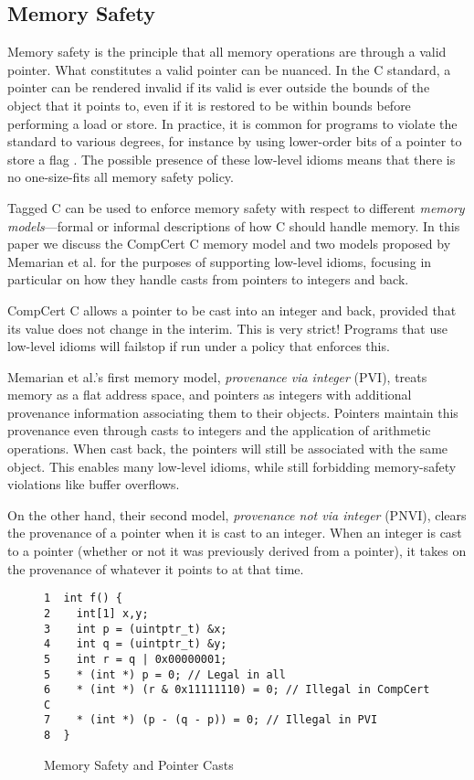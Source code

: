 \documentclass{llncs}
\begin{document}
\subsection{Memory Safety}

Memory safety is the principle that all memory operations are through a valid pointer. What constitutes
a valid pointer can be nuanced. In the C standard, a pointer can be rendered invalid if its valid
is ever outside the bounds of the object that it points to, even if it is restored to be within
bounds before performing a load or store. In practice, it is common for programs to violate the
standard to various degrees, for instance by using lower-order bits of a pointer to store a flag
\cite{Memarian16:DeFacto}. The possible presence of these low-level idioms means that there is
no one-size-fits all memory safety policy.

Tagged C can be used to enforce memory safety with respect to different {\em memory models}---formal
or informal descriptions of how C should handle memory. In this paper we discuss the CompCert C
memory model and two models proposed by Memarian et al. \cite{Memarian19:ExploringCSemantics}
for the purposes of supporting low-level idioms, focusing in particular on how they handle
casts from pointers to integers and back.

CompCert C allows a pointer to be cast into an integer and back, provided that its value
does not change in the interim. This is very strict! Programs that use low-level idioms
will failstop if run under a policy that enforces this.

Memarian et al.'s first memory model, {\em provenance via integer} (PVI), treats memory
as a flat address space, and pointers as integers with additional provenance information
associating them to their objects. Pointers maintain this provenance even through casts to
integers and the application of arithmetic operations. When cast back, the pointers will still
be associated with the same object. This enables many low-level idioms, while still forbidding
memory-safety violations like buffer overflows.

On the other hand, their second model, {\em provenance not via integer} (PNVI), clears the
provenance of a pointer when it is cast to an integer. When an integer is cast to a pointer
(whether or not it was previously derived from a pointer), it takes on the provenance of whatever
it points to at that time.

\begin{figure}
\begin{verbatim}
1  int f() {
2    int[1] x,y;
3    int p = (uintptr_t) &x;
4    int q = (uintptr_t) &y;
5    int r = q | 0x00000001;
5    * (int *) p = 0; // Legal in all
6    * (int *) (r & 0x11111110) = 0; // Illegal in CompCert C
7    * (int *) (p - (q - p)) = 0; // Illegal in PVI
8  }
\end{verbatim}
\caption{Memory Safety and Pointer Casts}
\label{fig:memsafe}
\end{figure}
\end{document}
